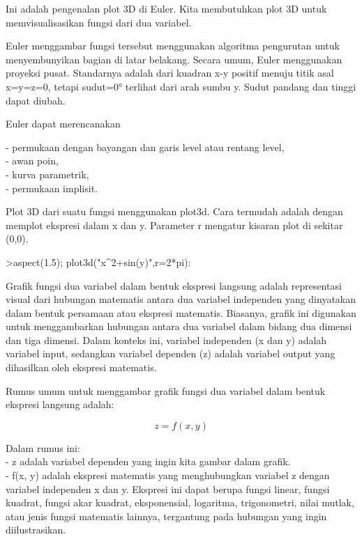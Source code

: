\documentclass[a4paper,10pt]{article}
\begin{document}
\begin{eulernotebook}
\begin{eulercomment}
Ini adalah pengenalan plot 3D di Euler. Kita membutuhkan plot 3D untuk
memvisualisasikan fungsi dari dua variabel.

Euler menggambar fungsi tersebut menggunakan algoritma pengurutan
untuk menyembunyikan bagian di latar belakang. Secara umum, Euler
menggunakan proyeksi pusat. Standarnya adalah dari kuadran x-y positif
menuju titik asal x=y=z=0, tetapi sudut=0° terlihat dari arah sumbu y.
Sudut pandang dan tinggi dapat diubah.

Euler dapat merencanakan

- permukaan dengan bayangan dan garis level atau rentang level,\\
- awan poin,\\
- kurva parametrik,\\
- permukaan implisit.

Plot 3D dari suatu fungsi menggunakan plot3d. Cara termudah adalah
dengan memplot ekspresi dalam x dan y. Parameter r mengatur kisaran
plot di sekitar (0,0).
\end{eulercomment}
\begin{eulerprompt}
>aspect(1.5); plot3d("x^2+sin(y)",r=2*pi): 
\end{eulerprompt}
\begin{eulercomment}
Grafik fungsi dua variabel dalam bentuk ekspresi langsung adalah
representasi visual dari hubungan matematis antara dua variabel
independen yang dinyatakan dalam bentuk persamaan atau ekspresi
matematis. Biasanya, grafik ini digunakan untuk menggambarkan hubungan
antara dua variabel dalam bidang dua dimensi dan tiga dimensi. Dalam
konteks ini, variabel independen (x dan y) adalah variabel input,
sedangkan variabel dependen (z) adalah variabel output yang dihasilkan
oleh ekspresi matematis.

Rumus umum untuk menggambar grafik fungsi dua variabel dalam bentuk
ekspresi langsung adalah:\\
\end{eulercomment}
\begin{eulerformula}
\[
z = f(x, y)
\]
\end{eulerformula}
\begin{eulercomment}
Dalam rumus ini:\\
- z adalah variabel dependen yang ingin kita gambar dalam grafik.\\
- f(x, y) adalah ekspresi matematis yang menghubungkan variabel z
dengan variabel independen x dan y. Ekspresi ini dapat berupa fungsi
linear, fungsi kuadrat, fungsi akar kuadrat, eksponensial, logaritma,
trigonometri, nilai mutlak, atau jenis fungsi matematis lainnya,
tergantung pada hubungan yang ingin diilustrasikan.


\end{eulercomment}
\end{eulernotebook}
\end{document}
